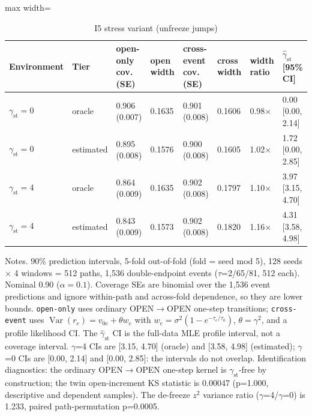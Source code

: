 \begin{table}[!htbp]
\centering
\footnotesize
\caption{I5 stress variant (unfreeze jumps)}
\label{tab:stress-scis}
\begin{adjustbox}{max width=\linewidth}
\begin{tabular}{@{}llllllll@{}}
\toprule
Environment & Tier & open-only cov. (SE) & open width & cross-event cov. (SE) & cross width & width ratio & $\hat\gamma_{\mathrm{st}}$ [95\% CI] \\
\midrule
$\gamma_{\mathrm{st}}=0$ & oracle & 0.906 (0.007) & 0.1635 & 0.901 (0.008) & 0.1606 & 0.98$\times$ & 0.00 [0.00, 2.14] \\
$\gamma_{\mathrm{st}}=0$ & estimated & 0.895 (0.008) & 0.1576 & 0.900 (0.008) & 0.1605 & 1.02$\times$ & 1.72 [0.00, 2.85] \\
$\gamma_{\mathrm{st}}=4$ & oracle & 0.864 (0.009) & 0.1635 & 0.902 (0.008) & 0.1797 & 1.10$\times$ & 3.97 [3.15, 4.70] \\
$\gamma_{\mathrm{st}}=4$ & estimated & 0.843 (0.009) & 0.1573 & 0.902 (0.008) & 0.1820 & 1.16$\times$ & 4.31 [3.58, 4.98] \\
\bottomrule
\end{tabular}
\end{adjustbox}
\vspace{0.5em}
\par\noindent\begin{minipage}{\linewidth}\raggedright{\footnotesize Notes. 90\% prediction intervals, 5-fold out-of-fold (fold = seed mod 5), 128 seeds $\times$ 4 windows = 512 paths, 1,536 double-endpoint events ($\tau$=2/65/81, 512 each). Nominal 0.90 ($\alpha=0.1$). Coverage SEs are binomial over the 1,536 event predictions and ignore within-path and across-fold dependence, so they are lower bounds. \texttt{open-only} uses ordinary OPEN$\to$OPEN one-step transitions; \texttt{cross-event} uses $\operatorname{Var}(r_e)=v_{0e}+\theta w_e$ with $w_e=\sigma^2(1-e^{-\tau_e/\tau_0})$, $\theta=\gamma^2$, and a profile likelihood CI. The $\hat\gamma_{\mathrm{st}}$ CI is the full-data MLE profile interval, not a coverage interval. $\gamma$=4 CIs are [3.15, 4.70] (oracle) and [3.58, 4.98] (estimated); $\gamma$=0 CIs are [0.00, 2.14] and [0.00, 2.85]: the intervals do not overlap. Identification diagnostics: the ordinary OPEN$\to$OPEN one-step kernel is $\gamma_{\mathrm{st}}$-free by construction; the twin open-increment KS statistic is 0.00047 (p=1.000, descriptive and dependent samples). The de-freeze $z^2$ variance ratio ($\gamma$=4/$\gamma$=0) is 1.233, paired path-permutation p=0.0005.}\end{minipage}\par

\end{table}
